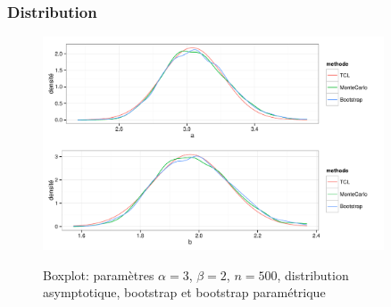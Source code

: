 \begin{frame}
\frametitle{Distribution}
\begin{figure}
  \centering
  \includegraphics[width=0.9\textwidth]{distribution}\\
  \caption{Boxplot: paramètres $\alpha=3$, $\beta=2$, $n=500$, distribution asymptotique, bootstrap et bootstrap paramétrique}
\end{figure}


\end{frame}


